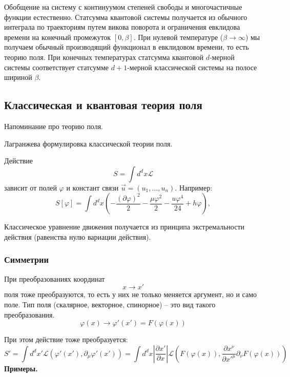 \documentclass[a4paper,12pt]{article} \usepackage[utf8x]{inputenc} \usepackage[russian]{babel}
\theoremstyle{definition} \newtheorem{corollary}{Corollary}[theorem] \theoremstyle{definition}
\begin{document}
Обобщение на систему с континуумом степеней свободы и многочастичные функции естественно. Статсумма
квантовой системы получается из обычного интеграла по траекториям путем викова поворота и
ограничения евклидова времени на конечный промежуток $[0,\beta]$. При нулевой температуре ($\beta\to
\infty$) мы получаем обычный производящий функционал в евклидовом времени, то есть теорию поля. При
конечных температурах статсумма квантовой $d$-мерной системы соответствует статсумме $d+1$-мерной
классической системы на полосе шириной $\beta$.

\subsection*{Классическая и квантовая теория поля}
\label{sec:qft} Напоминание про теорию поля.

Лагранжева формулировка классической теории поля.

 Действие
\begin{equation} S=\int d^dx \mathcal{L}
\end{equation} зависит от полей $\varphi$ и констант связи $\vec u=(u_1,\dots,u_n)$. Например:
\begin{equation} S[\varphi]=\int d^d x\left( -\frac{(\partial \varphi)^2}{2}-\frac{\mu
\varphi^2}{2}-\frac{u\varphi^4}{24}+h\varphi\right),
\end{equation}

Классическое уравнение движения получается из принципа экстремальности действия (равенства нулю
вариации действия).

\subsubsection*{Симметрии}
\label{sec:symmetry}

При преобразованиях координат
\begin{equation}
  \label{eq:303} x\to x'
\end{equation} поля тоже преобразуются, то есть у них не только меняется аргумент, но и само поле.
Тип поля (скалярное, векторное, спинорное) -- это вид такого преобразования.
\begin{equation}
  \label{eq:304} \varphi(x)\to \varphi'(x')=F(\varphi(x))
\end{equation}

При этом действие тоже преобразуется:
\begin{equation}
  \label{eq:305} S'=\int d^{d}x' \mathcal{L}(\varphi'(x'),\partial_{\mu} \varphi'(x'))=\int d^{d}x
\left|\frac{\partial x'}{\partial x}\right| \mathcal{L}(F(\varphi(x)),\frac{\partial
x^{\nu}}{\partial x'^{\mu}} \partial_{\nu}F(\varphi(x)))
\end{equation} {\bf Примеры.}
\end{document}
